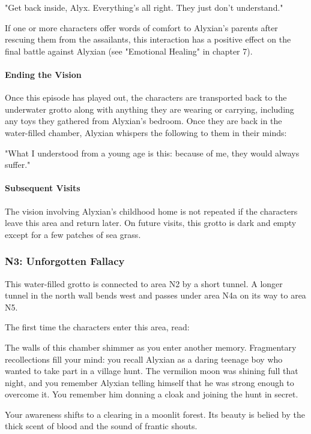 \documentclass[10pt,a4paper,twoside,bg=print,twocolumn,openany,nodeprecatedcode]{dndbook}
\begin{document}
\begin{DndReadAloud}{}
"Get back inside, Alyx. Everything's all right. They just don't understand."

\end{DndReadAloud}

If one or more characters offer words of comfort to Alyxian's parents after rescuing them from the assailants, this interaction has a positive effect on the final battle against Alyxian (see "Emotional Healing" in chapter 7).

\paragraph{Ending the Vision}
Once this episode has played out, the characters are transported back to the underwater grotto along with anything they are wearing or carrying, including any toys they gathered from Alyxian's bedroom. Once they are back in the water-filled chamber, Alyxian whispers the following to them in their minds:

\begin{DndReadAloud}{}
"What I understood from a young age is this: because of me, they would always suffer."

\end{DndReadAloud}

\paragraph{Subsequent Visits}
The vision involving Alyxian's childhood home is not repeated if the characters leave this area and return later. On future visits, this grotto is dark and empty except for a few patches of sea grass.

\subsubsection{N3: Unforgotten Fallacy}
This water-filled grotto is connected to area N2 by a short tunnel. A longer tunnel in the north wall bends west and passes under area N4a on its way to area N5.

The first time the characters enter this area, read:

\begin{DndReadAloud}{}
The walls of this chamber shimmer as you enter another memory. Fragmentary recollections fill your mind: you recall Alyxian as a daring teenage boy who wanted to take part in a village hunt. The vermilion moon was shining full that night, and you remember Alyxian telling himself that he was strong enough to overcome it. You remember him donning a cloak and joining the hunt in secret.

Your awareness shifts to a clearing in a moonlit forest. Its beauty is belied by the thick scent of blood and the sound of frantic shouts.

\end{DndReadAloud}
\end{document}
